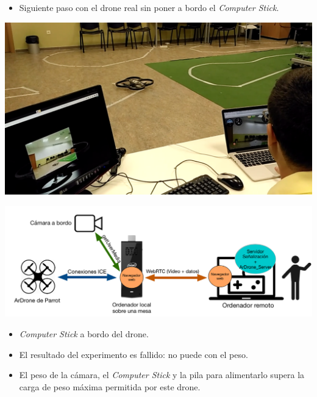 \documentclass[notes,slidesec,a4]{seminar}
\begin{document}

\begin{hslide}
\begin{itemize}
\item Siguiente paso con el drone real sin poner a bordo el \emph{Computer Stick}.
\end{itemize}

\begin{minipage}[t]{0.3\textwidth}
\includegraphics[width=\textwidth]{img/experimentodronereal1}
\end{minipage}
\begin{minipage}[t]{0.7\textwidth}
\includegraphics[width=\textwidth]{img/esquema_experimento2}
\end{minipage}

\end{hslide}


\begin{hslide}
\begin{itemize}
\item \emph{Computer Stick} a bordo del drone.
\item El resultado del experimento es fallido: no puede con el peso.
\item El peso de la cámara, el \emph{Computer Stick} y la pila para alimentarlo supera la carga de peso máxima permitida por este drone.
\end{itemize}
\end{hslide}
\end{document}
